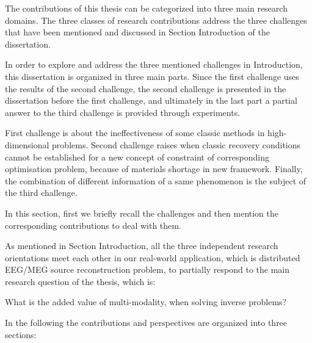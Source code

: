 

The contributions of this thesis can be categorized into three main research domains. 
The three classes of research contributions address the three challenges that have been mentioned and discussed in Section Introduction of the dissertation.

In order to explore and address the three mentioned challenges in Introduction, this dissertation is organized in three main parts.
Since the first challenge uses the results of the second challenge, the second challenge is presented in the dissertation before the first challenge, and ultimately in the last part a partial answer to the third challenge is provided through experiments.

First challenge is about the ineffectiveness of some classic methods in high-dimensional problems.
Second challenge raises when classic recovery conditions cannot be established for a new concept of constraint of corresponding optimisation problem, because of materials shortage in new framework. 
Finally, the combination of different information of a same phenomenon is the subject of the third challenge.

In this section, first we briefly recall the challenges and then mention the corresponding contributions to deal with them.

As mentioned in Section Introduction, all the three independent research orientations meet each other in our real-world application, which is distributed EEG/MEG source reconstruction problem, to partially respond to the main research question of the thesis, which is:
\begin{tcolorbox}
What is the added value of multi-modality, when solving inverse problems?
\end{tcolorbox}
In the following the contributions and perspectives are organized into three sections:
\newpage
\section*{}

\section*{}

\section*{}
